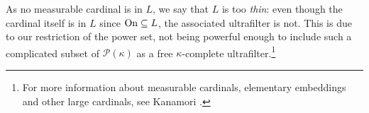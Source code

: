 
As no measurable cardinal is in $L$, we say that $L$ is too \textit{thin}: even though the cardinal itself is in $L$ since $\operatorname{On}\subseteq L$, the associated ultrafilter is not. This is due to our restriction of the power set, not being powerful enough to include such a complicated subset of $\mathcal{P}(\kappa)$ as a free $\kappa$-complete ultrafilter.\footnote{For more information about measurable cardinals, elementary embeddings and other large cardinals, see Kanamori \cite{Kanamori}.}